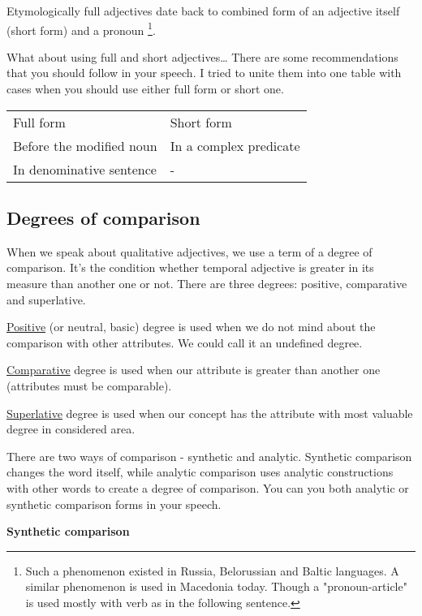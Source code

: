 Etymologically full adjectives date back to combined form of an adjective itself (short form) and a pronoun \footnote{Such a phenomenon existed in Russia, Belorussian and Baltic languages. A similar phenomenon is used in Macedonia today. Though a "pronoun-article" is used mostly with verb as in the following sentence.}. 

What about using full and short adjectives… There are some recommendations that you should follow in your speech. I tried to unite them into one table with cases when you should use either full form or short one.

\begin{table}
	\begin{tabular}{ll}
		Full form & Short form \\
		Before the modified noun & In a complex predicate \\
		In denominative sentence & - \\
	\end{tabular}
\end{table}


\subsection{Degrees of comparison}

When we speak about qualitative adjectives, we use a term of a degree of comparison. It’s the condition whether temporal adjective is greater in its measure than another one or not. There are three degrees: positive, comparative and superlative.

\underline{Positive} (or neutral, basic) degree is used when we do not mind about the comparison with other attributes. We could call it an undefined degree.

\underline{Comparative} degree is used when our attribute is greater than another one (attributes must be comparable).  

\underline{Superlative} degree is used when our concept has the attribute with most valuable degree in considered area.

There are two ways of comparison - synthetic and analytic. Synthetic comparison changes the word itself, while analytic comparison uses analytic constructions with other words to create a degree of comparison. You can you both analytic or synthetic comparison forms in your speech.

\textbf{Synthetic comparison}

